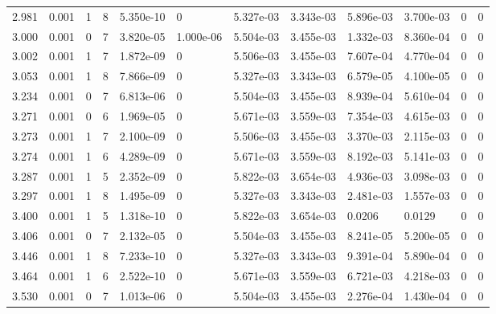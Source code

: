 \documentclass[preview]{standalone}
\begin{document}
{{{\begin{tabular}{L{1.2cm}C{1.2cm} C{0.3cm}C{0.5cm} C{1.4cm}C{1.4cm} C{1.4cm}C{1.4cm} C{1.6cm}C{1.6cm} C{1.6cm}C{1.6cm}}
  2.981  &  0.001  & 1     &  8 &  5.350e-10  & 0  &  5.327e-03&   3.343e-03& 5.896e-03 & 3.700e-03   &  0 & 0  \\ 
  3.000  &  0.001  & 0     &  7 &  3.820e-05  & 1.000e-06  &  5.504e-03&   3.455e-03& 1.332e-03 & 8.360e-04   &  0 & 0  \\ 
  3.002  &  0.001  & 1     &  7 &  1.872e-09  & 0  &  5.506e-03&   3.455e-03& 7.607e-04 & 4.770e-04   &  0 & 0  \\ 
  3.053  &  0.001  & 1     &  8 &  7.866e-09  & 0  &  5.327e-03&   3.343e-03& 6.579e-05 & 4.100e-05   &  0 & 0  \\ 
  3.234  &  0.001  & 0     &  7 &  6.813e-06  & 0  &  5.504e-03&   3.455e-03& 8.939e-04 & 5.610e-04   &  0 & 0  \\ 
  3.271  &  0.001  & 0     &  6 &  1.969e-05  & 0  &  5.671e-03&   3.559e-03& 7.354e-03 & 4.615e-03   &  0 & 0  \\ 
  3.273  &  0.001  & 1     &  7 &  2.100e-09  & 0  &  5.506e-03&   3.455e-03& 3.370e-03 & 2.115e-03   &  0 & 0  \\ 
  3.274  &  0.001  & 1     &  6 &  4.289e-09  & 0  &  5.671e-03&   3.559e-03& 8.192e-03 & 5.141e-03   &  0 & 0  \\ 
  3.287  &  0.001  & 1     &  5 &  2.352e-09  & 0  &  5.822e-03&   3.654e-03& 4.936e-03 & 3.098e-03   &  0 & 0  \\ 
  3.297  &  0.001  & 1     &  8 &  1.495e-09  & 0  &  5.327e-03&   3.343e-03& 2.481e-03 & 1.557e-03   &  0 & 0  \\ 
  3.400  &  0.001  & 1     &  5 &  1.318e-10  & 0  &  5.822e-03&   3.654e-03& 0.0206 & 0.0129   &  0 & 0  \\ 
  3.406  &  0.001  & 0     &  7 &  2.132e-05  & 0  &  5.504e-03&   3.455e-03& 8.241e-05 & 5.200e-05   &  0 & 0  \\ 
  3.446  &  0.001  & 1     &  8 &  7.233e-10  & 0  &  5.327e-03&   3.343e-03& 9.391e-04 & 5.890e-04   &  0 & 0  \\ 
  3.464  &  0.001  & 1     &  6 &  2.522e-10  & 0  &  5.671e-03&   3.559e-03& 6.721e-03 & 4.218e-03   &  0 & 0  \\ 
  3.530  &  0.001  & 0     &  7 &  1.013e-06  & 0  &  5.504e-03&   3.455e-03& 2.276e-04 & 1.430e-04   &  0 & 0  \\ 
\hline 
\end{tabular} 

}}}
\end{document}

